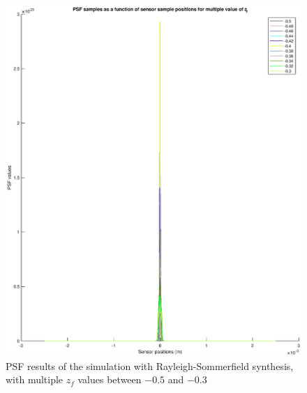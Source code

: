\documentclass[12pt,a4paper,english
]{tunithesis}
\begin{document}
\begin{figure}
  \centering
  \includegraphics[width=\columnwidth]{img/psf_multiple_rs.eps}
  \caption{PSF results of the simulation with Rayleigh-Sommerfield synthesis, with multiple $z_f$ values between $-0.5$ and $-0.3$}
  \label{fig:psf_multiple_rs}
\end{figure}
\end{document}
